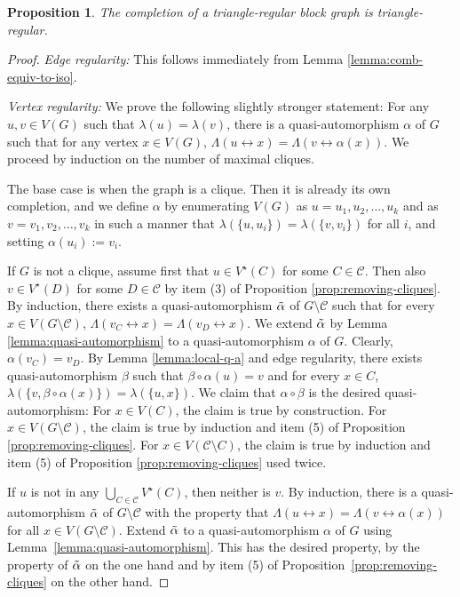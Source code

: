 \documentclass[a4paper, 11pt]{amsart}
\numberwithin{theorem}{section}
\newtheorem{proposition}[theorem]{Proposition}
\newcommand{\cC}{\mathcal{C}}
\begin{document}
\begin{proposition}
    The completion of a triangle-regular block graph is triangle-regular.
\end{proposition}
\begin{proof}
    \textit{Edge regularity:} This follows immediately from Lemma \ref{lemma:comb-equiv-to-iso}.
    
    \textit{Vertex regularity:} We prove the following slightly
    stronger statement: For any $u,v\in V(G)$ such that $\lambda(u) =
    \lambda(v)$, there is a quasi-automorphism $\alpha$ of $G$ such that for any vertex $x\in V(G)$, $\Lambda(u\leftrightarrow x) = \Lambda(v\leftrightarrow \alpha (x))$. We proceed by induction on the number of maximal cliques. 

    The base case is when the graph is a clique. Then it is already
    its own completion, and we define $\alpha$ by enumerating $V(G)$
    as $u=u_1,u_2,\ldots,u_k$ and as $v=v_1,v_2,\ldots,v_k$ in such a
    manner that $\lambda(\{u,u_i\})=\lambda(\{v,v_i\})$ for all $i$,
    and setting $\alpha(u_i):=v_i$. 

    If $G$ is not a clique, assume first that $u\in V^\star(C)$ for some $C
    \in \cC$. Then also $v\in V^\star(D)$ for some $D \in \cC$ by
    item (3) of Proposition \ref{prop:removing-cliques}. By
    induction, there exists a quasi-automorphism $\Tilde{\alpha}$ of
    $G\setminus\mathcal C$ such that for every $x\in V(G\setminus
    \mathcal{C})$, $\Lambda(v_C\leftrightarrow x) =
    \Lambda(v_D\leftrightarrow x)$. We extend $\Tilde{\alpha}$ by
    Lemma \ref{lemma:quasi-automorphism} to a quasi-automorphism
    $\alpha$ of $G$. Clearly, $\alpha(v_C) = v_D$. By Lemma
    \ref{lemma:local-q-a} and edge regularity, there exists
    quasi-automorphism $\beta$ such that $\beta\circ\alpha(u) = v$ and
    for every $x\in C$, $\lambda(\{v,\beta\circ\alpha(x)\}) =
    \lambda(\{u,x\})$. We claim that $\alpha\circ \beta$ is the desired quasi-automorphism: For $x\in V(C)$, the claim is true by construction. For $x\in V(G\setminus \mathcal{C})$, the claim is true by induction and item (5) of Proposition \ref{prop:removing-cliques}. For $x\in V(\mathcal C\setminus C)$, the claim is true by induction and item (5) of Proposition \ref{prop:removing-cliques} used twice.

    If $u$ is not in any $\bigcup_{C \in \mathcal C} V^\star(C)$, then neither
    is $v$. By induction, there is a quasi-automorphism $\Tilde{\alpha}$
    of $G \setminus \cC$ with the property that $\Lambda(u \leftrightarrow
    x)=\Lambda(v \leftrightarrow \alpha(x))$ for all $x \in V(G \setminus
    \cC)$. Extend $\Tilde{\alpha}$ to a quasi-automorphism $\alpha$ of
    $G$ using Lemma~\ref{lemma:quasi-automorphism}. This has the desired
    property, by the property of $\Tilde{\alpha}$ on the one hand and by
    item (5) of Proposition~\ref{prop:removing-cliques} on the other hand.


\end{proof}
\end{document}
